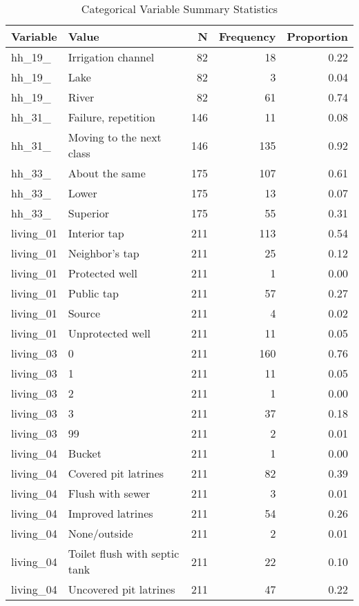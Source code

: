 \begin{table}[!t]
\caption*{
{\large Categorical Variable Summary Statistics}
} 
\fontsize{12.0pt}{14.4pt}\selectfont
\begin{tabular*}{\linewidth}{@{\extracolsep{\fill}}llrrr}
\toprule
Variable & Value & N & Frequency & Proportion \\ 
\midrule\addlinespace[2.5pt]
hh\_19\_ & Irrigation channel & 82 & 18 & 0.22 \\ 
hh\_19\_ & Lake & 82 & 3 & 0.04 \\ 
hh\_19\_ & River & 82 & 61 & 0.74 \\ 
hh\_31\_ & Failure, repetition & 146 & 11 & 0.08 \\ 
hh\_31\_ & Moving to the next class & 146 & 135 & 0.92 \\ 
hh\_33\_ & About the same & 175 & 107 & 0.61 \\ 
hh\_33\_ & Lower & 175 & 13 & 0.07 \\ 
hh\_33\_ & Superior & 175 & 55 & 0.31 \\ 
living\_01 & Interior tap & 211 & 113 & 0.54 \\ 
living\_01 & Neighbor’s tap & 211 & 25 & 0.12 \\ 
living\_01 & Protected well & 211 & 1 & 0.00 \\ 
living\_01 & Public tap & 211 & 57 & 0.27 \\ 
living\_01 & Source & 211 & 4 & 0.02 \\ 
living\_01 & Unprotected well & 211 & 11 & 0.05 \\ 
living\_03 & 0 & 211 & 160 & 0.76 \\ 
living\_03 & 1 & 211 & 11 & 0.05 \\ 
living\_03 & 2 & 211 & 1 & 0.00 \\ 
living\_03 & 3 & 211 & 37 & 0.18 \\ 
living\_03 & 99 & 211 & 2 & 0.01 \\ 
living\_04 & Bucket & 211 & 1 & 0.00 \\ 
living\_04 & Covered pit latrines & 211 & 82 & 0.39 \\ 
living\_04 & Flush with sewer & 211 & 3 & 0.01 \\ 
living\_04 & Improved latrines & 211 & 54 & 0.26 \\ 
living\_04 & None/outside & 211 & 2 & 0.01 \\ 
living\_04 & Toilet flush with septic tank & 211 & 22 & 0.10 \\ 
living\_04 & Uncovered pit latrines & 211 & 47 & 0.22 \\ 
\bottomrule
\end{tabular*}
\end{table}

